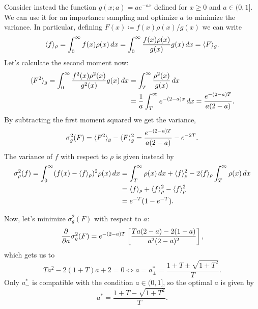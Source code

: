 Consider instead the function $g(x; a) = ae^{-ax}$ defined for $x \geq 0$ and $a
\in (0, 1]$. We can use it for an importance sampling and optimize $a$ to
minimize the variance. In particular, defining $F(x) \coloneq f(x) \rho(x) /
g(x)$ we can write
\begin{equation}
  \langle f\rangle_{\rho} = \int_{0}^{\infty} f(x) \rho(x) \, dx = 
  \int_{0}^{\infty} \frac{f(x)\rho(x)}{g(x)} g(x) \, dx = 
  \langle F\rangle_{g}.
\end{equation}
Let’s calculate the second moment now:
\begin{equation}
  \begin{split}
    \langle F^{2}\rangle_{g} = \int_{0}^{\infty} \frac{f^{2}(x) \rho^2(x)}{g^{2}(x)}
    g(x) \, dx &= \int_{T}^{\infty} \frac{\rho^{2}(x)}{g(x)}\, dx \\
               &= \frac{1}{a} \int_{T}^{\infty} e^{-(2-a) x} \, dx =
               \frac{e^{-(2-a)T}}{a(2-a)}.
  \end{split}
\end{equation}
By subtracting the first moment squared we get the variance,
\begin{equation}
  \sigma^{2}_g(F) = \langle F^{2}\rangle_g - \langle F\rangle_{g}^{2}
  = \frac{e^{-(2-a)T}}{a(2-a)} - e^{-2T}.
\end{equation}
The variance of $f$ with respect to $\rho$ is given instead by
\begin{equation}
  \begin{split}
    \sigma^{2}_{\rho}(f)
    = \int_{0}^{\infty} (f(x) - \langle f\rangle_{\rho})^{2} \rho(x) \, dx
    &= \int_{T}^{\infty} \rho(x) \, dx + \langle f\rangle_{\rho}^{2}
    - 2 \langle f\rangle_{\rho} \int_{T}^{\infty} \rho(x) \, dx \\
    &= \langle f\rangle_{\rho} + \langle f\rangle^{2}_{\rho} - \langle f\rangle^{2}_{\rho} \\
    &= e^{-T}(1 - e^{-T}).
  \end{split}
\end{equation}

Now, let’s minimize $\sigma^{2}_g(F)$ with respect to $a$:
\begin{equation}
  \pdiff{}{a} \sigma^{2}_{g}(F) = e^{-(2-a)T} \left[\frac{Ta(2-a) -
  2(1-a)}{a^{2}(2-a)^{2}}\right],
\end{equation}
which gets us to
\begin{equation}
  Ta^{2} - 2(1 + T) a + 2 = 0 \iff a = a^*_{\pm}
  = \frac{1 + T \pm \sqrt{1 + T^{2}}}{T}.
\end{equation}
Only $a^*_{-}$ is compatible with the condition $a \in (0, 1]$, so the optimal
$a$ is given by
\begin{equation}
  a^* = \frac{1 + T - \sqrt{1 + T^{2}}}{T}.
\end{equation}


